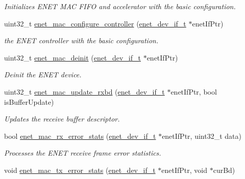 \begin{DoxyCompactItemize}
\begin{DoxyCompactList}\small\item\em Initializes E\+N\+ET M\+AC F\+I\+FO and accelerator with the basic configuration. \end{DoxyCompactList}\item 
uint32\+\_\+t \hyperlink{group__enet__driver_gab0d5777fec2e878d669d7dc6e0b852ac}{enet\+\_\+mac\+\_\+configure\+\_\+controller} (\hyperlink{group__enet__driver_ga497f30fbc93952e93d9fb8cf78480b75}{enet\+\_\+dev\+\_\+if\+\_\+t} $\ast$enet\+If\+Ptr)
\begin{DoxyCompactList}\small\item\em the E\+N\+ET controller with the basic configuration. \end{DoxyCompactList}\item 
uint32\+\_\+t \hyperlink{group__enet__driver_gacdf9384feb894e88ec822b93ea872db6}{enet\+\_\+mac\+\_\+deinit} (\hyperlink{group__enet__driver_ga497f30fbc93952e93d9fb8cf78480b75}{enet\+\_\+dev\+\_\+if\+\_\+t} $\ast$enet\+If\+Ptr)
\begin{DoxyCompactList}\small\item\em Deinit the E\+N\+ET device. \end{DoxyCompactList}\item 
uint32\+\_\+t \hyperlink{group__enet__driver_ga85275c880f839247d9b710a704b52c8e}{enet\+\_\+mac\+\_\+update\+\_\+rxbd} (\hyperlink{group__enet__driver_ga497f30fbc93952e93d9fb8cf78480b75}{enet\+\_\+dev\+\_\+if\+\_\+t} $\ast$enet\+If\+Ptr, bool is\+Buffer\+Update)
\begin{DoxyCompactList}\small\item\em Updates the receive buffer descriptor. \end{DoxyCompactList}\item 
bool \hyperlink{group__enet__driver_gad0bd22d5c79fe6c3eecaa5d6cd4d3452}{enet\+\_\+mac\+\_\+rx\+\_\+error\+\_\+stats} (\hyperlink{group__enet__driver_ga497f30fbc93952e93d9fb8cf78480b75}{enet\+\_\+dev\+\_\+if\+\_\+t} $\ast$enet\+If\+Ptr, uint32\+\_\+t data)
\begin{DoxyCompactList}\small\item\em Processes the E\+N\+ET receive frame error statistics. \end{DoxyCompactList}\item 
void \hyperlink{group__enet__driver_ga867fe0a61a4e5ee594d3b8d58e1f40a3}{enet\+\_\+mac\+\_\+tx\+\_\+error\+\_\+stats} (\hyperlink{group__enet__driver_ga497f30fbc93952e93d9fb8cf78480b75}{enet\+\_\+dev\+\_\+if\+\_\+t} $\ast$enet\+If\+Ptr, void $\ast$cur\+Bd)

\end{DoxyCompactItemize}
